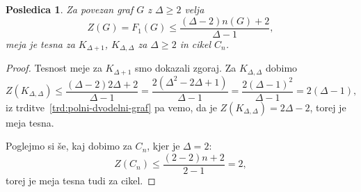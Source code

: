 \documentclass[12pt,a4paper,twoside]{article}
\theoremstyle{definition} %
\theoremstyle{plain} %
\newtheorem{posledica}[definicija]{Posledica}
\numberwithin{equation}{section}  %
\begin{document}
\begin{posledica}
    Za povezan graf $G$ z $\Delta \geq 2$ velja
    \begin{equation}
        \label{eq:zgornja-meja-zf-povezan}
        Z(G) = F_1(G) \leq \frac{(\Delta - 2)n(G) + 2}{\Delta - 1},
    \end{equation}
    meja je tesna za $K_{\Delta + 1}$, $K_{\Delta, \Delta}$ za $\Delta \geq 2$ in cikel $C_n$.
\end{posledica}
\begin{proof}
    Tesnost meje za $K_{\Delta + 1}$ smo dokazali zgoraj. Za $K_{\Delta, \Delta}$ dobimo
    \[ Z(K_{\Delta, \Delta}) \leq \frac{(\Delta - 2)2\Delta + 2}{\Delta - 1} = \frac{2(\Delta^2 - 2 \Delta + 1)}{\Delta - 1} = \frac{2(\Delta- 1)^2}{\Delta - 1} = 2 (\Delta-1), \]
    iz trditve~\ref{trd:polni-dvodelni-graf} pa vemo, da je $Z(K_{\Delta, \Delta}) = 2\Delta - 2$, torej je meja tesna.

    Poglejmo si še, kaj dobimo za $C_n$, kjer je $\Delta= 2$:
    \[ Z(C_n) \leq \frac{(2 - 2)n + 2}{2 - 1} = 2, \]
    torej je meja tesna tudi za cikel.
\end{proof}
\end{document}
